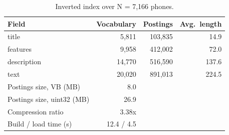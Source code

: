 \begin{table}[t]
\centering
\small
\begin{tabular}{lrrr}
\toprule
Field & Vocabulary & Postings & Avg.\ length \\
\midrule
title & 5,811 & 103,835 & 14.9 \\
features & 9,958 & 412,002 & 72.0 \\
description & 14,770 & 516,590 & 137.6 \\
text & 20,020 & 891,013 & 224.5 \\
\midrule Postings size, VB (MB) & 8.0 &  &  \\
Postings size, uint32 (MB) & 26.9 &  &  \\
Compression ratio & 3.38x &  &  \\
Build / load time (s) & 12.4 / 4.5 &  &  \\
\bottomrule
\end{tabular}
\caption{Inverted index over N = 7,166 phones.}
\label{tab:index}
\end{table}
